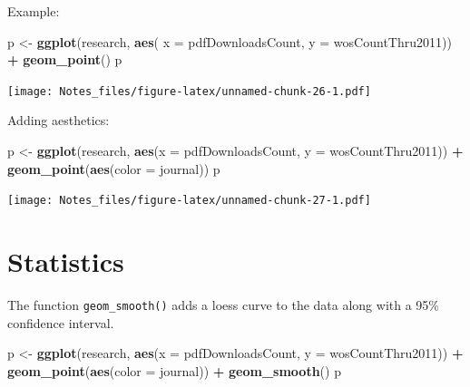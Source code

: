 \documentclass[
]{book}
\newenvironment{Shaded}{\begin{snugshade}}{\end{snugshade}}
\newcommand{\DataTypeTok}[1]{\textcolor[rgb]{0.13,0.29,0.53}{#1}}
\newcommand{\KeywordTok}[1]{\textcolor[rgb]{0.13,0.29,0.53}{\textbf{#1}}}
\newcommand{\NormalTok}[1]{#1}
\newcommand{\OperatorTok}[1]{\textcolor[rgb]{0.81,0.36,0.00}{\textbf{#1}}}
\newcommand{\StringTok}[1]{\textcolor[rgb]{0.31,0.60,0.02}{#1}}
\begin{document}
Example:

\begin{Shaded}
\begin{Highlighting}[]
\NormalTok{p <-}\StringTok{ }\KeywordTok{ggplot}\NormalTok{(research, }\KeywordTok{aes}\NormalTok{( }\DataTypeTok{x =}\NormalTok{ pdfDownloadsCount, }\DataTypeTok{y =}\NormalTok{ wosCountThru2011)) }\OperatorTok{+}\StringTok{ }\KeywordTok{geom_point}\NormalTok{()}
\NormalTok{p}
\end{Highlighting}
\end{Shaded}

\texttt{[image: Notes\_files/figure-latex/unnamed-chunk-26-1.pdf]}

Adding aesthetics:

\begin{Shaded}
\begin{Highlighting}[]
\NormalTok{p <-}\StringTok{ }\KeywordTok{ggplot}\NormalTok{(research, }\KeywordTok{aes}\NormalTok{(}\DataTypeTok{x =}\NormalTok{ pdfDownloadsCount,}
                          \DataTypeTok{y =}\NormalTok{ wosCountThru2011)) }\OperatorTok{+}
\StringTok{  }\KeywordTok{geom_point}\NormalTok{(}\KeywordTok{aes}\NormalTok{(}\DataTypeTok{color =}\NormalTok{ journal))}
\NormalTok{p}
\end{Highlighting}
\end{Shaded}

\texttt{[image: Notes\_files/figure-latex/unnamed-chunk-27-1.pdf]}

\hypertarget{statistics}{%
\section{Statistics}\label{statistics}}

The function \texttt{geom\_smooth()} adds a loess curve to the data along with a 95\% confidence interval.

\begin{Shaded}
\begin{Highlighting}[]
\NormalTok{p <-}\StringTok{ }\KeywordTok{ggplot}\NormalTok{(research, }\KeywordTok{aes}\NormalTok{(}\DataTypeTok{x =}\NormalTok{ pdfDownloadsCount,}
                          \DataTypeTok{y =}\NormalTok{ wosCountThru2011)) }\OperatorTok{+}
\StringTok{  }\KeywordTok{geom_point}\NormalTok{(}\KeywordTok{aes}\NormalTok{(}\DataTypeTok{color =}\NormalTok{ journal)) }\OperatorTok{+}
\StringTok{  }\KeywordTok{geom_smooth}\NormalTok{()}
\NormalTok{p}
\end{Highlighting}
\end{Shaded}
\end{document}
